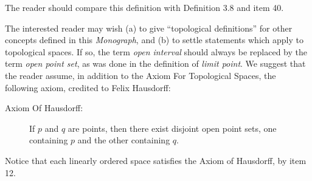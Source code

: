 \documentclass{book}
\begin{document}
The reader should compare this definition with Definition 3.8 and item 40.

The interested reader may wish (a) to give ``topological definitions'' for other concepts defined in this \emph{Monograph}, and (b) to settle statements which apply to topological spaces. If so, the term \emph{open interval} should always be replaced by the term \emph{open point set}, as was done in the definition of \emph{limit point}. We suggest that the reader assume, in addition to the Axiom For Topological Spaces, the following axiom, credited to Felix Hausdorff:

\begin{description}

\item[Axiom Of Hausdorff:] If $p$ and $q$ are points, then there exist disjoint open point sets, one containing $p$ and the other containing $q$.

\end{description}

Notice that each linearly ordered space satisfies the Axiom of Hausdorff, by item 12.
\end{document}
